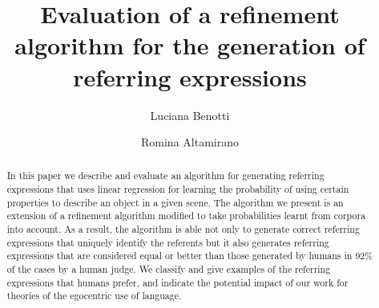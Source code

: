 \documentclass{llncs}
\begin{document}
\mainmatter              %
%
\title{Evaluation of a refinement algorithm for the generation of referring expressions}
%
%
\author{Luciana Benotti \and Romina Altamirano}
%
%

\maketitle              %

\begin{abstract}
In this paper we describe and evaluate an algorithm for generating referring expressions that uses linear regression for learning the probability of using certain properties to describe an object in a given scene. The  algorithm we present is an extension of a refinement algorithm modified to take probabilities learnt from corpora into account. As a result, the algorithm is able not only to generate correct referring expressions that uniquely identify the referents but it also generates referring expressions that are considered equal or better than those generated by humans in 92\% of the cases by a human judge. We classify and give examples of the referring expressions that humans prefer, and indicate the potential impact of our work for theories of the egocentric use of language. 
\end{abstract}
%



%






\end{document}
